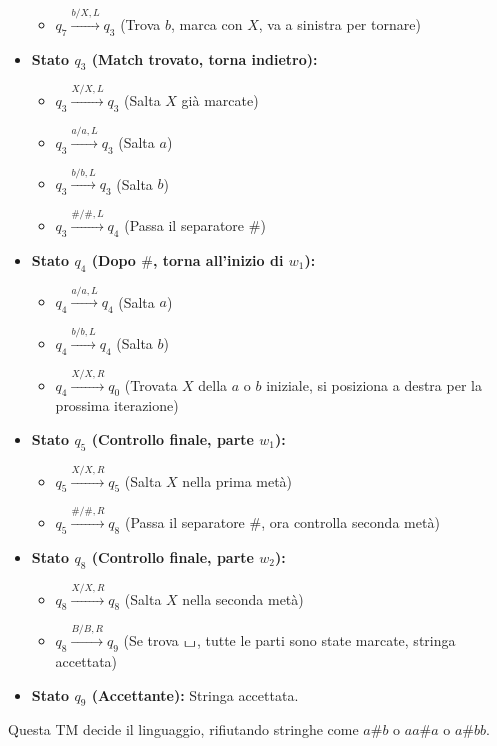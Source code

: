 \documentclass[a4paper]{article}
\theoremstyle{definition} %
\newcommand{\blankS}{\ensuremath{\raisebox{-0.15ex}{\scalebox{1.3}[0.7]{$\sqcup$}}}}
\begin{document}
\begin{itemize}
\begin{itemize}
            \item $q_7 \xrightarrow{b / X, L} q_3$ (Trova $b$, marca con $X$, va a sinistra per tornare)
        \end{itemize}
    \item \textbf{Stato $q_3$ (Match trovato, torna indietro):}
        \begin{itemize}
            \item $q_3 \xrightarrow{X / X, L} q_3$ (Salta $X$ già marcate)
            \item $q_3 \xrightarrow{a / a, L} q_3$ (Salta $a$)
            \item $q_3 \xrightarrow{b / b, L} q_3$ (Salta $b$)
            \item $q_3 \xrightarrow{\# / \#, L} q_4$ (Passa il separatore $\#$)
        \end{itemize}
    \item \textbf{Stato $q_4$ (Dopo $\#$, torna all'inizio di $w_1$):}
        \begin{itemize}
            \item $q_4 \xrightarrow{a / a, L} q_4$ (Salta $a$)
            \item $q_4 \xrightarrow{b / b, L} q_4$ (Salta $b$)
            \item $q_4 \xrightarrow{X / X, R} q_0$ (Trovata $X$ della $a$ o $b$ iniziale, si posiziona a destra per la prossima iterazione)
        \end{itemize}
    \item \textbf{Stato $q_5$ (Controllo finale, parte $w_1$):}
        \begin{itemize}
            \item $q_5 \xrightarrow{X / X, R} q_5$ (Salta $X$ nella prima metà)
            \item $q_5 \xrightarrow{\# / \#, R} q_8$ (Passa il separatore $\#$, ora controlla seconda metà)
        \end{itemize}
    \item \textbf{Stato $q_8$ (Controllo finale, parte $w_2$):}
        \begin{itemize}
            \item $q_8 \xrightarrow{X / X, R} q_8$ (Salta $X$ nella seconda metà)
            \item $q_8 \xrightarrow{B / B, R} q_9$ (Se trova \blankS, tutte le parti sono state marcate, stringa accettata)
        \end{itemize}
    \item \textbf{Stato $q_9$ (Accettante):} Stringa accettata.
\end{itemize}
Questa TM decide il linguaggio, rifiutando stringhe come $a\#b$ o $aa\#a$ o $a\#bb$.
\end{document}
